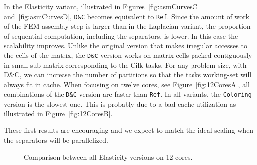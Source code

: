 \documentclass[10pt]{IOS-Book-Article}
\begin{document}
In the Elasticity variant, illustrated in Figures~\ref{fig:asmCurvesC} and~\ref{fig:asmCurvesD}, {\tt D\&C} becomes equivalent to {\tt Ref}.
Since the amount of work of the FEM assembly step is larger than in the Laplacian variant, the proportion of sequential computation, including the separators, is lower.
In this case the scalability improves.
Unlike the original version that makes irregular accesses to the cells of the matrix, the {\tt D\&C} version works on matrix cells packed contiguously in small sub-matrix corresponding to the Cilk tasks.
For any problem size, with D\&C, we can increase the number of partitions so that the tasks working-set will always fit in cache.
When focusing on twelve cores, see Figure~\ref{fig:12CoresA}, all combinations of the {\tt D\&C} version are faster than {\tt Ref}.
In all variants, the {\tt Coloring} version is the slowest one.
This is probably due to a bad cache utilization as illustrated in Figure~\ref{fig:12CoresB}.

These first results are encouraging and we expect to match the ideal scaling when the separators will be parallelized.

\begin{figure}[t]
 \caption{Comparison between all Elasticity versions on 12 cores.}
 \label{fig:12Cores}
\end{figure}
\end{document}
